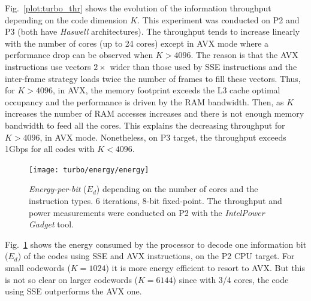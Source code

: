 Fig.~\ref{plot:turbo_thr} shows the evolution of the information throughput
depending on the code dimension $K$. This experiment was conducted on P2 and P3
(both have \emph{ Haswell} architectures). The throughput tends to increase
linearly with the number of cores (up to 24 cores) except in AVX mode where a
performance drop can be observed when $K > 4096$. The reason is that the AVX
instructions use vectors $2\times$ wider than those used by SSE instructions and
the inter-frame strategy loads twice the number of frames to fill these vectors.
Thus, for $K > 4096$, in AVX, the memory footprint exceeds the L3 cache optimal
occupancy and the performance is driven by the RAM bandwidth. Then, as $K$
increases the number of RAM accesses increases and there is not enough memory
bandwidth to feed all the cores. This explains the decreasing throughput for
$K > 4096$, in AVX mode. Nonetheless, on P3 target, the throughput exceeds 1Gbps
for all codes with $K<4096$.

\begin{figure}
  \centering
  \texttt{[image: turbo/energy/energy]}
  \caption{\emph{Energy-per-bit} ($E_d$) depending on the number of cores and
    the instruction types. 6 iterations, 8-bit fixed-point. The throughput and
    power measurements were conducted on P2 with the
    \emph{Intel\R Power Gadget} tool.}
  \label{plot:turbo_energy}
\end{figure}

Fig.~\ref{plot:turbo_energy} shows the energy consumed by the processor to
decode one information bit ($E_d$) of the codes using SSE and AVX instructions,
on the P2 CPU target. For small codewords ($K=1024$) it is more energy efficient
to resort to AVX. But this is not so clear on larger codewords ($K=6144$) since
with 3/4 cores, the code using SSE outperforms the AVX one.

